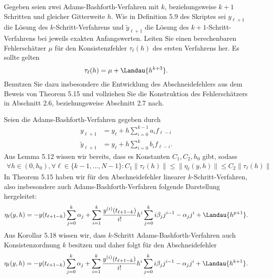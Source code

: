 \begin{exercise}
Gegeben seien zwei Adams-Bashforth-Verfahren mit $k$, beziehungsweise $k + 1$
Schritten und gleicher Gitterweite $h$. Wie in Definition 5.9 des Skriptes sei
$y_{\ell + 1}$ die Lösung des $k$-Schritt-Verfahrens und $\widetilde{y}_{\ell + 1}$
die Lösung des $k + 1$-Schritt-Verfahrens bei jeweils exakten Anfangswerten.
Leiten Sie einen berechenbaren Fehlerschätzer $\mu$ für den Konsistenzfehler $\tau_{\ell}(h)$
des ersten Verfahrens her. Es sollte gelten
\begin{align*}
  \tau_{\ell}(h) = \mu + \Landau{h^{k+3}}.
\end{align*}
Benutzen Sie dazu insbesondere die Entwicklung des Abschneidefehlers aus dem Beweis
von Theorem 5.15 und vollziehen Sie die Konstruktion des Fehlerschätzers in Abschnitt
2.6, beziehungsweise Abschnitt 2.7 nach.
\end{exercise}
\begin{solution}
Seien die Adams-Bashforth-Verfahren gegeben durch
\begin{align*}
  y_{\ell + 1} &= y_{\ell} + h\sum_{i = 0}^{k-1} a_i f_{\ell - i} \\
  \widetilde{y}_{\ell + 1} &= y_{\ell} + h\sum_{i = 0}^{k} b_i f_{\ell - i}.
\end{align*}
Aus Lemma 5.12 wissen wir bereits, dass es Konstanten $C_1,C_2, h_0$ gibt, sodass
\begin{align*}
  \forall h \in (0,h_0), \forall \ell \in \{k-1,\dots,N-1\}: C_1\|\tau_{\ell}(h)\|
  \leq \|\eta_{\ell}(y,h)\| \leq C_2\|\tau_{\ell}(h)\|
\end{align*}
In Theorem 5.15 haben wir für den Abschneidefehler linearer $k$-Schritt-Verfahren,
also insbesondere auch Adams-Bashforth-Verfahren folgende Darstellung hergeleitet:
\begin{align*}
  \eta_{\ell}(y,h) = -y(t_{\ell + 1 - k})\sum_{j= 0}^k\alpha_j + \sum_{i=1}^k \frac{y^{(i)}(t_{\ell + 1 - k})}{i!}
  h^i\sum_{j= 0}^ki\beta_jj^{i-1} - \alpha_j j^{i} + \Landau{h^{p+1}}.
\end{align*}
Aus Korollar 5.18 wissen wir, dass $k$-Schritt Adams-Bashforth-Verfahren auch
Konsistenzordnung $k$ besitzen und daher folgt für den Abschneidefehler
\begin{align*}
\eta_{\ell}(y,h) = -y(t_{\ell + 1 - k})\sum_{j= 0}^k\alpha_j + \sum_{i=1}^k \frac{y^{(i)}(t_{\ell + 1 - k})}{i!}
h^i\sum_{j= 0}^ki\beta_jj^{i-1} - \alpha_j j^{i} + \Landau{h^{k+1}}.
\end{align*}
\end{solution}
